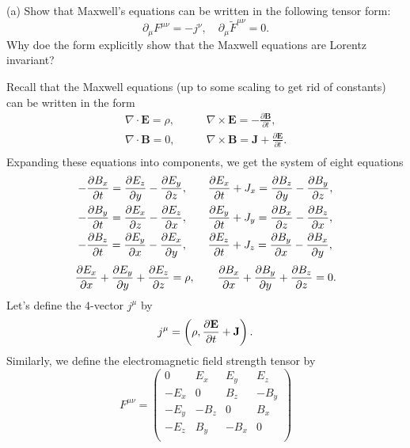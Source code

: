 \documentclass{../../templates/lkx_pset}
\begin{document}
\begin{problem}{4}
\end{problem}
\begin{parts}
	\begin{part}{(a)}
		Show that Maxwell's equations can be written in the following tensor form:
		\[
			\partial_\mu F^{\mu\nu} = -j^\nu,\quad\partial_\mu \widetilde{F}^{\mu\nu}=0.
		\]
		Why doe the form explicitly show that the Maxwell equations are Lorentz invariant?
	\end{part}

	Recall that the Maxwell equations (up to some scaling to get rid of constants) can be written in the form
	\[
		\begin{aligned}
			\nabla \cdot \mathbf{E} = \rho, \quad & \quad \nabla \times \mathbf{E} = -\frac{\partial \mathbf{B}}{\partial t},           \\
			\nabla \cdot \mathbf{B} = 0, \quad    & \quad \nabla \times \mathbf{B} = \mathbf{J}+\frac{\partial \mathbf{E}}{\partial t}. \\
		\end{aligned}
	\]
	Expanding these equations into components, we get the system of eight equations
	\[
		\begin{aligned}
			-\frac{\partial B_x}{\partial t} = \frac{\partial E_z}{\partial y} -\frac{\partial E_y}{\partial z},
			\quad & \quad \frac{\partial E_x}{\partial t} +  J_x = \frac{\partial B_z}{\partial y} -\frac{\partial B_y}{\partial z}, \\
			-\frac{\partial B_y}{\partial t} = \frac{\partial E_x}{\partial z} -\frac{\partial E_z}{\partial x},
			\quad & \quad \frac{\partial E_y}{\partial t} +  J_y = \frac{\partial B_x}{\partial z} -\frac{\partial B_z}{\partial x}, \\
			-\frac{\partial B_z}{\partial t} = \frac{\partial E_y}{\partial x} -\frac{\partial E_x}{\partial y},
			\quad & \quad \frac{\partial E_z}{\partial t} +  J_z = \frac{\partial B_y}{\partial x} -\frac{\partial B_x}{\partial y}, \\
		\end{aligned}
	\]\[
		\begin{aligned}
			\frac{\partial E_x}{\partial x}+\frac{\partial E_y}{\partial y}+\frac{\partial E_z}{\partial z}= \rho,\quad\quad
			\frac{\partial B_x}{\partial x}+\frac{\partial B_y}{\partial y}+\frac{\partial B_z}{\partial z}= 0.
		\end{aligned}
	\]
	Let's define the $4$-vector $j^\mu$ by
	\[
		j^\mu = \left(\rho, \frac{\partial \mathbf{E}}{\partial t} + \mathbf{J}\right).
	\]
	Similarly, we define the electromagnetic field strength tensor by
	\[
		F^{\mu\nu} = \begin{pmatrix}
			0    & E_x  & E_y  & E_z  \\
			-E_x & 0    & B_z & -B_y  \\
			-E_y & -B_z  & 0    & B_x \\
			-E_z & B_y & -B_x  & 0    \\
		\end{pmatrix}
\]
\end{parts}
\end{document}
